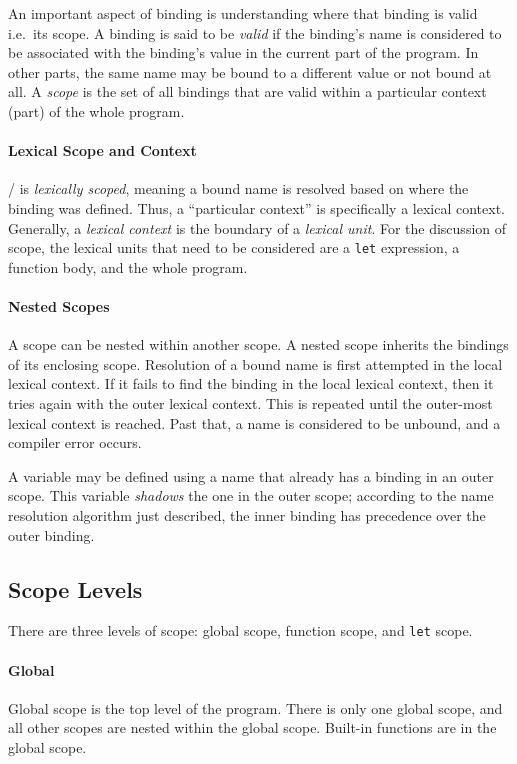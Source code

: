 An important aspect of binding is understanding where that binding is valid i.e.\ its scope. A binding is said to be \textit{valid} if the binding's name is considered to be associated with the binding's value in the current part of the program. In other parts, the same name may be bound to a different value or not bound at all. A \textit{scope} is the set of all bindings that are valid within a particular context (part) of the whole program.

\paragraph{Lexical Scope and Context}
\lispy/ is \textit{lexically scoped}, meaning a bound name is resolved based on where the binding was defined. Thus, a ``particular context'' is specifically a lexical context. Generally, a \textit{lexical context} is the boundary of a \textit{lexical unit}. For the discussion of scope, the lexical units that need to be considered are a \texttt{let} expression, a function body, and the whole program.

\paragraph{Nested Scopes}
A scope can be nested within another scope. A nested scope inherits the bindings of its enclosing scope. Resolution of a bound name is first attempted in the local lexical context. If it fails to find the binding in the local lexical context, then it tries again with the outer lexical context. This is repeated until the outer-most lexical context is reached. Past that, a name is considered to be unbound, and a compiler error occurs.

A variable may be defined using a name that already has a binding in an outer scope. This variable \textit{shadows} the one in the outer scope; according to the name resolution algorithm just described, the inner binding has precedence over the outer binding.

\subsection{Scope Levels}
There are three levels of scope: global scope, function scope, and \texttt{let} scope.

\paragraph{Global}
Global scope is the top level of the program. There is only one global scope, and all other scopes are nested within the global scope. Built-in functions are in the global scope.

